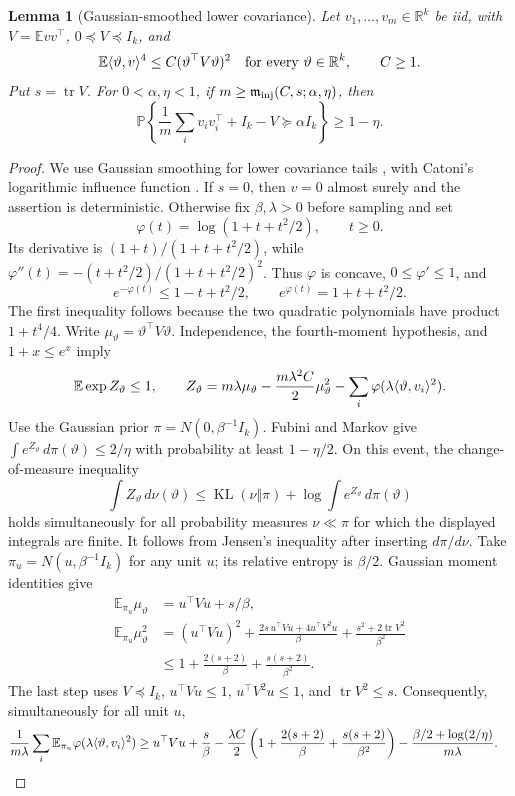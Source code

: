 \documentclass[11pt,a4paper]{article}
\newtheorem{lemma}[theorem]{Lemma}
\theoremstyle{definition}\newtheorem{definition}[theorem]{Definition}
\theoremstyle{remark}\newtheorem{remark}[theorem]{Remark}
\numberwithin{equation}{section}
\newcommand{\R}{\mathbb R}\newcommand{\E}{\mathbb E}\newcommand{\Pp}{\mathbb P}
\DeclareMathOperator{\tr}{tr}\DeclareMathOperator{\rank}{rank}
\begin{document}
\begin{lemma}[Gaussian-smoothed lower covariance]
\label{app:lem:lower-smoothing}
Let $v_1,\ldots,v_m\in\R^k$ be iid, with
$V=\E vv^\top$, $0\preceq V\preceq I_k$, and
\[
 \E\ip\vartheta v^4\le C(\vartheta^\top V\vartheta)^2
       \quad\text{for every }\vartheta\in\R^k,
 \qquad C\ge1.
\]
Put $s=\tr V$. For $0<\alpha,\eta<1$, if
$m\ge\mathfrak m_{\rm inj}(C,s;\alpha,\eta)$, then
\[
 \Pp\left\{\frac1m\sum_i v_iv_i^\top+I_k-V
                       \succeq\alpha I_k\right\}\ge1-\eta.
\]
\end{lemma}
\begin{proof}
We use Gaussian smoothing for lower covariance tails
\cite{Oliveira2016}, with Catoni's logarithmic influence function
\cite{Catoni2012}. If $s=0$, then $v=0$ almost surely and the assertion
is deterministic. Otherwise fix $\beta,\lambda>0$ before sampling and set
\[
 \varphi(t)=\log(1+t+t^2/2),\qquad t\ge0.
\]
Its derivative is $(1+t)/(1+t+t^2/2)$, while
$\varphi''(t)=-(t+t^2/2)/(1+t+t^2/2)^2$. Thus $\varphi$ is concave,
$0\le\varphi'\le1$, and
\[
 e^{-\varphi(t)}\le1-t+t^2/2,
 \qquad e^{\varphi(t)}=1+t+t^2/2.
\]
The first inequality follows because the two quadratic polynomials
have product $1+t^4/4$. Write $\mu_\vartheta=\vartheta^\top V\vartheta$.
Independence, the fourth-moment hypothesis, and $1+x\le e^x$ imply
\[
 \E\exp Z_\vartheta\le1,\qquad
 Z_\vartheta=m\lambda\mu_\vartheta
  -\frac{m\lambda^2C}{2}\mu_\vartheta^2
  -\sum_i\varphi(\lambda\ip\vartheta{v_i}^2).
\]
Use the Gaussian prior $\pi=N(0,\beta^{-1}I_k)$. Fubini and Markov give
$\int e^{Z_\vartheta}\,d\pi(\vartheta)\le2/\eta$ with probability
at least $1-\eta/2$. On this event, the change-of-measure inequality
\[
 \int Z_\vartheta\,d\nu(\vartheta)
 \le\operatorname{KL}(\nu\Vert\pi)
                   +\log\int e^{Z_\vartheta}\,d\pi(\vartheta)
\]
holds simultaneously for all probability measures $\nu\ll\pi$ for
which the displayed integrals are finite. It follows from Jensen's
inequality after inserting $d\pi/d\nu$.
Take $\pi_u=N(u,\beta^{-1}I_k)$ for any unit $u$; its relative entropy
is $\beta/2$. Gaussian moment identities give
\begin{align*}
 \E_{\pi_u}\mu_\vartheta
  &=u^\top Vu+s/\beta,\\
 \E_{\pi_u}\mu_\vartheta^2
  &=(u^\top Vu)^2+
       \frac{2s\,u^\top Vu+4u^\top V^2u}{\beta}
       +\frac{s^2+2\tr V^2}{\beta^2}\\
  &\le1+\frac{2(s+2)}\beta+\frac{s(s+2)}{\beta^2}.
\end{align*}
The last step uses $V\preceq I_k$, $u^\top Vu\le1$,
$u^\top V^2u\le1$, and $\tr V^2\le s$. Consequently, simultaneously
for all unit $u$,
\begin{align*}
 \frac1{m\lambda}\sum_i\E_{\pi_u}
            \varphi(\lambda\ip\vartheta{v_i}^2)
 &\ge u^\top Vu+\frac s\beta
 -\frac{\lambda C}{2}
       \left(1+\frac{2(s+2)}\beta+\frac{s(s+2)}{\beta^2}\right)
 -\frac{\beta/2+\log(2/\eta)}{m\lambda}.
\end{align*}


\end{proof}
\end{document}
